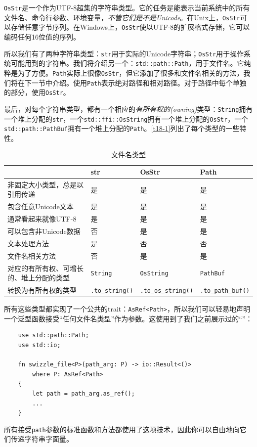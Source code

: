 \texttt{OsStr}是一个作为UTF-8超集的字符串类型。它的任务是能表示当前系统中的所有文件名、命令行参数、环境变量，\emph{不管它们是不是Unicode}。在Unix上，\texttt{OsStr}可以存储任意字节序列。在Windows上，\texttt{OsStr}使以UTF-8的扩展格式存储，它可以编码任何16位值的序列。

所以我们有了两种字符串类型：\texttt{str}用于实际的Unicode字符串；\texttt{OsStr}用于操作系统可能用到的字符串。我们将介绍另一个：\texttt{std::path::Path}，用于文件名。它纯粹是为了方便。\texttt{Path}实际上很像\texttt{OsStr}，但它添加了很多和文件名相关的方法，我们将在下一节中介绍。使用\texttt{Path}表示绝对路径和相对路径。对于路径中每个单独的部分，使用\texttt{OsStr}。

最后，对每个字符串类型，都有一个相应的\emph{有所有权的(owning)}类型：\texttt{String}拥有一个堆上分配的\texttt{str}，一个\texttt{std::ffi::OsString}拥有一个堆上分配的\texttt{OsStr}，一个\texttt{std::path::PathBuf}拥有一个堆上分配的\texttt{Path}。\autoref{t18-1}列出了每个类型的一些特性。

\begin{table}[htbp]
    \centering
    \caption{文件名类型}
    \label{t18-1}
    \begin{tabular}{llll}
        \hline
        & \textbf{str} & \textbf{OsStr} & \textbf{Path} \\
        \hline
        非固定大小类型，总是以引用传递 & 是 & 是 & 是 \\
        \rowcolor{tablecolor}
        包含任意Unicode文本 & 是 & 是 & 是 \\
        通常看起来就像UTF-8 & 是 & 是 & 是 \\
        \rowcolor{tablecolor}
        可以包含非Unicode数据 & 否 & 是 & 是 \\
        文本处理方法    & 是 & 否 & 否 \\
        \rowcolor{tablecolor}
        文件名相关方法  & 否 & 是 & 是 \\
        对应的有所有权、可增长的、堆上分配的类型 & \texttt{String} & \texttt{OsString} & \texttt{PathBuf} \\
        \rowcolor{tablecolor}
        转换为有所有权的类型  & \texttt{.to\_string()} & \texttt{.to\_os\_string()} & \texttt{.to\_path\_buf()} \\
    \end{tabular}
\end{table}

所有这些类型都实现了一个公共的trait：\texttt{AsRef<Path>}，所以我们可以轻易地声明一个泛型函数接受“任何文件名类型”作为参数。这使用到了我们之前展示过的“”：
\begin{verbatim}
    use std::path::Path;
    use std::io;

    fn swizzle_file<P>(path_arg: P) -> io::Result<()>
        where P: AsRef<Path>
    {
        let path = path_arg.as_ref();
        ...
    }
\end{verbatim}

所有接受\texttt{path}参数的标准函数和方法都使用了这项技术，因此你可以自由地向它们传递字符串字面量。



